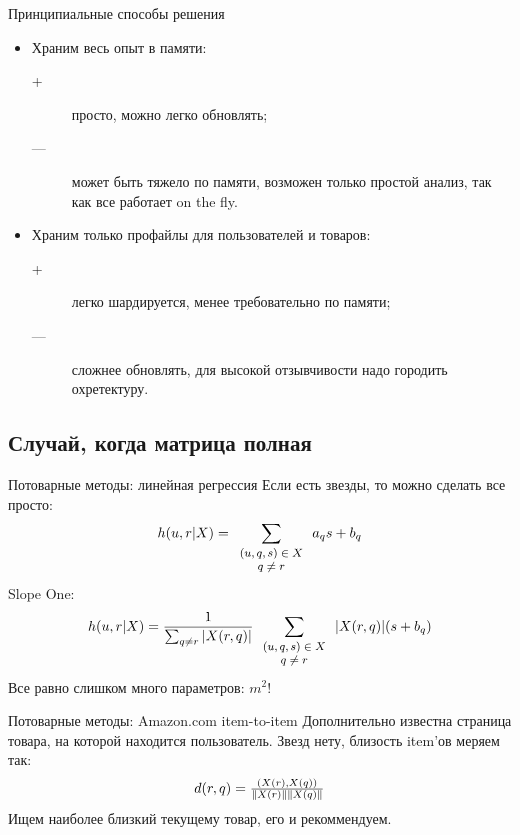 \documentclass[14pt, fleqn, xcolor={dvipsnames, table}]{beamer}
\begin{document}
\begin{frame}{Принципиальные способы решения}
\begin{itemize}
  \item Храним весь опыт в памяти:
  \begin{description}
    \item[\color{green}+] просто, можно легко обновлять;
    \item[\color{red}---] может быть тяжело по памяти, возможен только простой анализ, так как все работает on the fly.
  \end{description}
  \item Храним только профайлы для пользователей и товаров:
  \begin{description}
    \item[\color{green}+] легко шардируется, менее требовательно по памяти;
    \item[\color{red}---] сложнее обновлять, для высокой отзывчивости надо городить охретектуру.
  \end{description}
\end{itemize}
\end{frame}

\subsection{Случай, когда матрица полная} %

\begin{frame}{Потоварные методы: линейная регрессия}
Если есть звезды, то можно сделать все просто:
$$
h(u, r|X) = \sum_{\footnotesize\begin{array}{c}(u,q,s) \in X \\ q \ne r\end{array}} a_q s + b_q
$$
Slope One:
$$
h(u, r|X) = \frac{1}{\sum_{q \ne r} |X(r,q)|} \sum_{\footnotesize\begin{array}{c}(u,q,s) \in X \\ q \ne r\end{array}} |X(r,q)|(s + b_q)
$$
Все равно слишком много параметров: $m^2$!
\end{frame}

\begin{frame}{Потоварные методы: Amazon.com item-to-item}
Дополнительно известна страница товара, на которой находится пользователь. Звезд нету, близость item'ов меряем так:
$$\begin{array}{l}
d(r,q) = {(X(r),X(q)) \over \|X(r)\| \|X(q)\|}
\end{array}$$
Ищем наиболее близкий текущему товар, его и рекоммендуем.
\end{frame}
\end{document}
